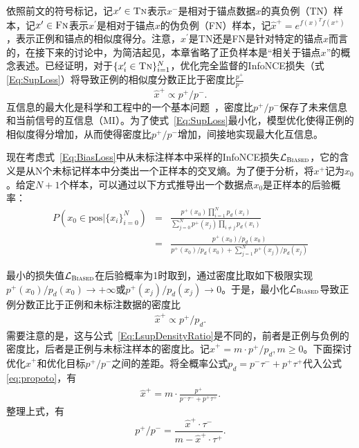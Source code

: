 依照前文的符号标记，记$x^\prime\in \textsc{Tn}$表示$x^-$是相对于锚点数据$x$的真负例（TN）样本，记$x^\prime\in \textsc{Fn}$表示$x^\prime$是相对于锚点$x$的伪负例（FN）样本，记$\hat{x}^+=e^{f(x)^Tf(x^+)}$，表示正例和锚点的相似度得分。注意，$x^\prime$是TN还是FN是针对特定的锚点$x$而言的，在接下来的讨论中，为简洁起见，本章省略了正负样本是“相关于锚点$x$”的概念表述。已经证明，对于$\{x_i^\prime \in \textsc{Tn} \}_{i=1}^N$，优化完全监督的InfoNCE损失（式\eqref{Eq:SupLoss}）将导致正例的相似度分数正比于密度比$\frac{p^+}{p^-}$\cite{Oord:2018:arxiv,Ben:2019:ICML}
\begin{equation}\label{Eq:LsupDensityRatio}
	\hat{x}^+ \propto p^+/p^-.
\end{equation}
互信息的最大化是科学和工程中的一个基本问题~\cite{Ben:2019:ICML,Belghazi:2018:ICML}，密度比$p^+/p^-$保存了未来信息和当前信号的互信息（MI）。为了使式~\eqref{Eq:SupLoss}最小化，模型优化使得正例的相似度得分增加，从而使得密度比$p^+/p^-$增加，间接地实现最大化互信息。

现在考虑式~\eqref{Eq:BiasLoss}中从未标注样本中采样的InfoNCE损失$\mathcal{L}_\textsc{Biased}$，它的含义是从N个未标记样本中分类出一个正样本的交叉熵。为了便于分析，将$x^+$记为$x_0$。给定$N+1$个样本，可以通过以下方式推导出一个数据点$x_0$是正样本的后验概率：
\begin{eqnarray}
	P(x_0\in \textrm{pos}| \{x_i\}_{i=0} ^N) 
	&=& \frac{p^+(x_0) \prod_{i=1}^{N} p_d(x_i)}{\sum_{j=0}^{N} p^+(x_j) \prod_{i \neq j} p_d (x_i)} \nonumber \\
	&=& \frac{p^+(x_0)/p_d(x_0)}{p^+(x_0)/p_d(x_0) + \sum_{j=1}^{N} p^+(x_j)/p_d(x_j)}
\end{eqnarray}

最小的损失值$\mathcal{L}_\textsc{Biased}$在后验概率为1时取到，通过密度比取如下极限实现$p^+(x_0)/p_d(x_0) \rightarrow +\infty$或$p^+(x_j)/p_d(x_j)\rightarrow 0$。于是，最小化$\mathcal{L}_\textsc{Biased}$导致正例分数正比于正例和未标注数据的密度比
\begin{eqnarray}\label{eq:propoto}
	\hat{x}^+ \propto p^+/p_d.
\end{eqnarray}
需要注意的是，这与公式~\eqref{Eq:LsupDensityRatio}是不同的，前者是正例与负例的密度比，后者是正例与未标注样本的密度比。记$\hat{x}^+ = m\cdot p^+/p_d, m \ge 0$。下面探讨优化$\hat{x}^+$和优化目标$p^+/p^-$之间的差距。将全概率公式$p_d = p^-\tau^-+ p^+\tau^+$代入公式\eqref{eq:propoto}，有
\begin{eqnarray} \label{eq:gap}
	\hat{x}^+ = m\cdot \frac{p^+}{p^-\tau^-+ p^+\tau^+}.
\end{eqnarray}
整理上式，有
\begin{equation}\label{eq:fractional}
	p^+/p^- = \frac{\hat{x}^+ \cdot \tau^-}{m-\hat{x}^+ \cdot \tau^+}.
\end{equation}
\par

